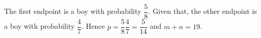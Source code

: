The first endpoint is a boy with probability $\dfrac{5}{8}$. Given that, the other endpoint is a boy with probability $\dfrac{4}{7}$. Hence $p=\dfrac{5}{8}\dfrac{4}{7}=\dfrac{5}{14}$ and $\boxed{m+n=19}$.

